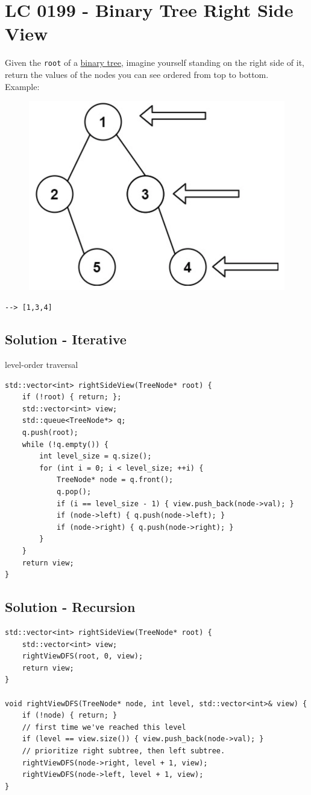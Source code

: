 \section{LC 0199 - Binary Tree Right Side View}
Given the {\colorbox{CodeBackground}{\lstinline|root|}} of a \ul{binary tree}, imagine yourself standing on the right side of it, return the values of the nodes you can see ordered from top to bottom.\\

Example:
\begin{figure}[H]
	\centering
	\includegraphics[width=0.33\linewidth]{images/lc0199_example}
	\label{fig:lc0199example}
\end{figure}
{\colorbox{CodeBackground}{\lstinline|--> [1,3,4]|}}

\subsection*{Solution - Iterative}
level-order traversal
\begin{lstlisting}
std::vector<int> rightSideView(TreeNode* root) {
	if (!root) { return; };
	std::vector<int> view;
	std::queue<TreeNode*> q;
	q.push(root);
	while (!q.empty()) {
		int level_size = q.size();
		for (int i = 0; i < level_size; ++i) {
			TreeNode* node = q.front();
			q.pop();
			if (i == level_size - 1) { view.push_back(node->val); }
			if (node->left) { q.push(node->left); }
			if (node->right) { q.push(node->right); }
		}
	}
	return view;
}
\end{lstlisting}

\subsection*{Solution - Recursion}
\begin{lstlisting}
std::vector<int> rightSideView(TreeNode* root) {
	std::vector<int> view;
	rightViewDFS(root, 0, view);
	return view;
}

void rightViewDFS(TreeNode* node, int level, std::vector<int>& view) {
	if (!node) { return; }
	// first time we've reached this level
	if (level == view.size()) { view.push_back(node->val); }
	// prioritize right subtree, then left subtree.
	rightViewDFS(node->right, level + 1, view);
	rightViewDFS(node->left, level + 1, view);
}
\end{lstlisting}

